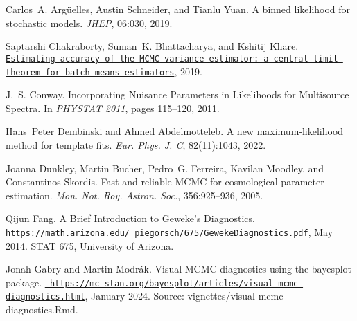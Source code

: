 
\begin{DoxyDescription}
\item[\label{citelist_CITEREF_Arguelles:2019izp}%
\Hypertarget{citelist_CITEREF_Arguelles:2019izp}%
\mbox{[}1\mbox{]}]Carlos~A. Argüelles, Austin Schneider, and Tianlu Yuan. A binned likelihood for stochastic models. {\itshape JHEP}, 06\+:030, 2019. 


\item[\label{citelist_CITEREF_chakraborty2019estimating}%
\Hypertarget{citelist_CITEREF_chakraborty2019estimating}%
\mbox{[}2\mbox{]}]Saptarshi Chakraborty, Suman~K. Bhattacharya, and Kshitij Khare. \href{https://doi.org/10.48550/arXiv.1911.00915}{\texttt{ Estimating accuracy of the MCMC variance estimator\+: a central limit theorem for batch means estimators}}, 2019.


\item[\label{citelist_CITEREF_Conway:2011in}%
\Hypertarget{citelist_CITEREF_Conway:2011in}%
\mbox{[}3\mbox{]}]J.~S. Conway. Incorporating Nuisance Parameters in Likelihoods for Multisource Spectra. In {\itshape PHYSTAT 2011}, pages 115--120, 2011. 


\item[\label{citelist_CITEREF_Dembinski:2022ios}%
\Hypertarget{citelist_CITEREF_Dembinski:2022ios}%
\mbox{[}4\mbox{]}]Hans~Peter Dembinski and Ahmed Abdelmotteleb. A new maximum-\/likelihood method for template fits. {\itshape Eur. Phys. J. C}, 82(11)\+:1043, 2022. 


\item[\label{citelist_CITEREF_Dunkley:2004sv}%
\Hypertarget{citelist_CITEREF_Dunkley:2004sv}%
\mbox{[}5\mbox{]}]Joanna Dunkley, Martin Bucher, Pedro~G. Ferreira, Kavilan Moodley, and Constantinos Skordis. Fast and reliable MCMC for cosmological parameter estimation. {\itshape Mon. Not. Roy. Astron. Soc.}, 356\+:925--936, 2005. 


\item[\label{citelist_CITEREF_Fang2014GewekeDiagnostics}%
\Hypertarget{citelist_CITEREF_Fang2014GewekeDiagnostics}%
\mbox{[}6\mbox{]}]Qijun Fang. A Brief Introduction to Geweke’s Diagnostics. \href{https://math.arizona.edu/~piegorsch/675/GewekeDiagnostics.pdf}{\texttt{ https\+://math.\+arizona.\+edu/~piegorsch/675/\+Geweke\+Diagnostics.\+pdf}}, May 2014. STAT 675, University of Arizona.


\item[\label{citelist_CITEREF_gabry2024visual}%
\Hypertarget{citelist_CITEREF_gabry2024visual}%
\mbox{[}7\mbox{]}]Jonah Gabry and Martin Modr\'{a}k. Visual MCMC diagnostics using the bayesplot package. \href{https://mc-stan.org/bayesplot/articles/visual-mcmc-diagnostics.html}{\texttt{ https\+://mc-\/stan.\+org/bayesplot/articles/visual-\/mcmc-\/diagnostics.\+html}}, January 2024. Source\+: vignettes/visual-\/mcmc-\/diagnostics.\+Rmd.



\end{DoxyDescription}
